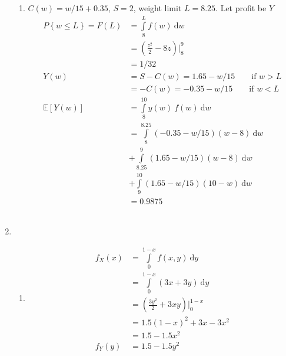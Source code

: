 \begin{enumerate}
\begin{enumerate}
			\item $ C(w) = w/15 + 0.35 $, $ S = 2 $, weight limit $ L = 8.25 $. Let profit be $ Y $\\
			\begin{align}
				P\left\{w \leq L\right\} = F(L) &= \int\limits_{8}^{L} f(w)\ \mathrm{d}w \nonumber \\
				&= \left(\frac{z^2}{2} - 8z\right) \Big|_8^9 \nonumber \\
				&=  1/32\\
				Y(w) &= S - C(w) = 1.65 - w/15  \qquad \text{if } w > L\nonumber \\
				&= - C(w) = -0.35 - w/15  \qquad \text{if } w < L\nonumber \\
				\mathbb{E}[Y(w)] &= \int\limits_{8}^{10} y(w)\ f(w)\ \mathrm{d}w \nonumber \\
				&= \int\limits_{8}^{8.25} (-0.35-w/15)(w-8)\ \mathrm{d}w \nonumber \\
				&+ \int\limits_{8.25}^{9} (1.65 - w/15)(w-8)\ \mathrm{d}w \nonumber \\
				&+ \int\limits_{9}^{10} (1.65-w/15)(10-w)\ \mathrm{d}w \\
				&= 0.9875 
			\end{align} \\
		\end{enumerate}
	
	
	\item 
		\begin{enumerate}
			
			\item \begin{align}
				f_X (x) &= \int\limits_{0}^{1-x} f(x, y)\ \mathrm{d}y \nonumber \\
				&= \int\limits_{0}^{1-x} (3x + 3y)\ \mathrm{d}y\nonumber \\
				&= \left(\frac{3y^2}{2} + 3xy\right) \Big|_0^{1-x} \\
				&= 1.5 (1-x)^2 + 3x - 3x^2 \nonumber \\
				&= 1.5 - 1.5x^2 \\
				f_Y (y) &= 1.5 - 1.5y^2
			\end{align} \\
			

\end{enumerate}
\end{enumerate}

